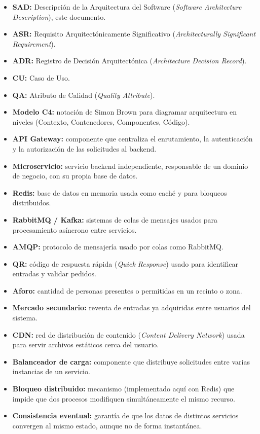 \documentclass[11pt,a4paper]{article}
\begin{document}
\begin{itemize}
\item \textbf{SAD:} Descripción de la Arquitectura del Software (\textit{Software Architecture
Description}), este documento.
\item \textbf{ASR:} Requisito Arquitectónicamente Significativo (\textit{Architecturally
Significant Requirement}).
\item \textbf{ADR:} Registro de Decisión Arquitectónica (\textit{Architecture Decision Record}).
\item \textbf{CU:} Caso de Uso.
\item \textbf{QA:} Atributo de Calidad (\textit{Quality Attribute}).
\item \textbf{Modelo C4:} notación de Simon Brown para diagramar arquitectura en niveles
(Contexto, Contenedores, Componentes, Código).
\item \textbf{API Gateway:} componente que centraliza el enrutamiento, la autenticación y la
autorización de las solicitudes al backend.
\item \textbf{Microservicio:} servicio backend independiente, responsable de un dominio de
negocio, con su propia base de datos.
\item \textbf{Redis:} base de datos en memoria usada como caché y para bloqueos distribuidos.
\item \textbf{RabbitMQ / Kafka:} sistemas de colas de mensajes usados para procesamiento
asíncrono entre servicios.
\item \textbf{AMQP:} protocolo de mensajería usado por colas como RabbitMQ.
\item \textbf{QR:} código de respuesta rápida (\textit{Quick Response}) usado para identificar
entradas y validar pedidos.
\item \textbf{Aforo:} cantidad de personas presentes o permitidas en un recinto o zona.
\item \textbf{Mercado secundario:} reventa de entradas ya adquiridas entre usuarios del sistema.
\item \textbf{CDN:} red de distribución de contenido (\textit{Content Delivery Network}) usada
para servir archivos estáticos cerca del usuario.
\item \textbf{Balanceador de carga:} componente que distribuye solicitudes entre varias instancias
de un servicio.
\item \textbf{Bloqueo distribuido:} mecanismo (implementado aquí con Redis) que impide que dos
procesos modifiquen simultáneamente el mismo recurso.
\item \textbf{Consistencia eventual:} garantía de que los datos de distintos servicios convergen
al mismo estado, aunque no de forma instantánea.
\end{itemize}
\end{document}
